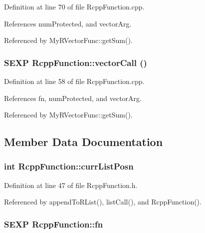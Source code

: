 Definition at line 70 of file RcppFunction.cpp.

References numProtected, and vectorArg.

Referenced by MyRVectorFunc::getSum().\hypertarget{classRcppFunction_ac57c514c761609892ff553434e134446}{
\subsubsection[{vectorCall}]{\setlength{\rightskip}{0pt plus 5cm}SEXP RcppFunction::vectorCall ()}}
\label{classRcppFunction_ac57c514c761609892ff553434e134446}


Definition at line 58 of file RcppFunction.cpp.

References fn, numProtected, and vectorArg.

Referenced by MyRVectorFunc::getSum().

\subsection{Member Data Documentation}
\hypertarget{classRcppFunction_ace513a92e96b36883b709b5352ea5663}{
\subsubsection[{currListPosn}]{\setlength{\rightskip}{0pt plus 5cm}int {\bf RcppFunction::currListPosn}}}
\label{classRcppFunction_ace513a92e96b36883b709b5352ea5663}


Definition at line 47 of file RcppFunction.h.

Referenced by appendToRList(), listCall(), and RcppFunction().\hypertarget{classRcppFunction_aa6b5966224b8b7d158be6cdfc3612063}{
\subsubsection[{fn}]{\setlength{\rightskip}{0pt plus 5cm}SEXP {\bf RcppFunction::fn}}}
\label{classRcppFunction_aa6b5966224b8b7d158be6cdfc3612063}


